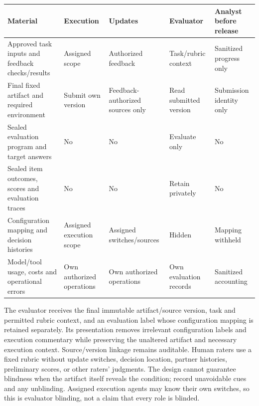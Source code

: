 \documentclass[
  english,
  11pt,
]{article}
\newcounter{none} %
\begin{document}
{\def\LTcaptype{none} %
\begin{longtable}[]{@{}
  >{\raggedright\arraybackslash}p{}
  >{\raggedright\arraybackslash}p{}
  >{\raggedright\arraybackslash}p{}
  >{\raggedright\arraybackslash}p{}
  >{\raggedright\arraybackslash}p{}@{}}
\toprule\noalign{}
\begin{minipage}[b]{\linewidth}\raggedright
Material
\end{minipage} & \begin{minipage}[b]{\linewidth}\raggedright
Execution
\end{minipage} & \begin{minipage}[b]{\linewidth}\raggedright
Updates
\end{minipage} & \begin{minipage}[b]{\linewidth}\raggedright
Evaluator
\end{minipage} & \begin{minipage}[b]{\linewidth}\raggedright
Analyst before release
\end{minipage} \\
\midrule\noalign{}
\endhead
\bottomrule\noalign{}
\endlastfoot
Approved task inputs and feedback checks/results & Assigned scope &
Authorized feedback & Task/rubric context & Sanitized progress only \\
Final fixed artifact and required environment & Submit own version &
Feedback-authorized sources only & Read submitted version & Submission
identity only \\
Sealed evaluation program and target answers & No & No & Evaluate only &
No \\
Sealed item outcomes, scores and evaluation traces & No & No & Retain
privately & No \\
Configuration mapping and decision histories & Assigned execution scope
& Assigned switches/sources & Hidden & Mapping withheld \\
Model/tool usage, costs and operational errors & Own authorized
operations & Own authorized operations & Own evaluation records &
Sanitized accounting \\
\end{longtable}
}

The evaluator receives the final immutable artifact/source version, task
and permitted rubric context, and an evaluation label whose
configuration mapping is retained separately. Its presentation removes
irrelevant configuration labels and execution commentary while
preserving the unaltered artifact and necessary execution context.
Source/version linkage remains auditable. Human raters use a fixed
rubric without update switches, decision location, partner histories,
preliminary scores, or other raters' judgments. The design cannot
guarantee blindness when the artifact itself reveals the condition;
record unavoidable cues and any unblinding. Assigned execution agents
may know their own switches, so this is evaluator blinding, not a claim
that every role is blinded.
\end{document}
